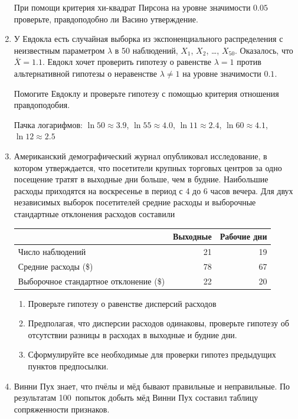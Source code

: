 \documentclass[12pt, a4paper]{article}\usepackage[]{graphicx}\usepackage[]{color}
\begin{document}
\begin{enumerate}
При помощи критерия хи-квадрат Пирсона на уровне значимости $0.05$ проверьте, правдоподобно ли Васино утверждение.

\item У Евдокла есть случайная выборка из экспоненциального распределения с неизвестным параметром $\lambda$ в 50 наблюдений, $X_1$, $X_2$, \ldots, $X_{50}$. Оказалось, что $\bar X = 1.1$. Евдокл хочет проверить гипотезу о равенстве $\lambda = 1$ против альтернативной гипотезы о неравенстве $\lambda \neq 1$ на уровне значимости $0.1$.

Помогите Евдоклу и проверьте гипотезу с помощью критерия отношения правдоподобия.

Пачка логарифмов: $\ln 50 \approx 3.9$, $\ln 55 \approx 4.0$, $\ln 11 \approx 2.4$, $\ln 60 \approx 4.1$, $\ln 12 \approx 2.5$


\item Американский демографический журнал опубликовал исследование, в котором утверждается, что посетители крупных торговых центров за одно посещение тратят  в выходные дни больше, чем в будние. Наибольшие расходы приходятся на воскресенье в период с 4 до 6 часов вечера. Для двух независимых выборок посетителей средние расходы и выборочные стандартные отклонения расходов составили

\begin{tabular}{lrr}
\toprule
 & Выходные & Рабочие дни \\
\midrule
Число наблюдений & 21 & 19 \\
Средние расходы (\$) & 78 & 67 \\
Выборочное стандартное отклонение (\$) & 22 & 20 \\
\bottomrule
\end{tabular}


\begin{enumerate}
\item Проверьте гипотезу о равенстве дисперсий расходов
\item Предполагая, что дисперсии расходов одинаковы, проверьте гипотезу об отсутствии разницы в расходах в выходные и будние дни.
\item Сформулируйте все необходимые для проверки гипотез предыдущих пунктов предпосылки.
\end{enumerate}



\item Винни Пух знает, что пчёлы и мёд бывают правильные и неправильные. По результатам 100~попыток добыть мёд Винни Пух составил таблицу сопряженности признаков.



\end{enumerate}
\end{document}
